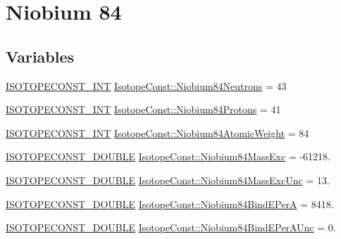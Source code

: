 \hypertarget{group___isotope_const-_niobium-_nb84}{}\section{Niobium 84}
\label{group___isotope_const-_niobium-_nb84}
\subsection*{Variables}
\begin{DoxyCompactItemize}
\item 
\mbox{\hyperlink{group___isotope_const-_macros_ga5f18360b3e99483a35c32d789e62621c}{I\+S\+O\+T\+O\+P\+E\+C\+O\+N\+S\+T\+\_\+\+I\+NT}} \mbox{\hyperlink{group___isotope_const-_niobium-_nb84_ga41d7ceaadec465ee9bd137307ea0e9d6}{Isotope\+Const\+::\+Niobium84\+Neutrons}} = 43
\item 
\mbox{\hyperlink{group___isotope_const-_macros_ga5f18360b3e99483a35c32d789e62621c}{I\+S\+O\+T\+O\+P\+E\+C\+O\+N\+S\+T\+\_\+\+I\+NT}} \mbox{\hyperlink{group___isotope_const-_niobium-_nb84_gaabbbb0f52addc00adb6d8c08ef7ca313}{Isotope\+Const\+::\+Niobium84\+Protons}} = 41
\item 
\mbox{\hyperlink{group___isotope_const-_macros_ga5f18360b3e99483a35c32d789e62621c}{I\+S\+O\+T\+O\+P\+E\+C\+O\+N\+S\+T\+\_\+\+I\+NT}} \mbox{\hyperlink{group___isotope_const-_niobium-_nb84_ga0bd887dd6a22a00e4fe5a78c0fd18c45}{Isotope\+Const\+::\+Niobium84\+Atomic\+Weight}} = 84
\item 
\mbox{\hyperlink{group___isotope_const-_macros_ga8f45a7272ce02c0b4c65c44636ed719a}{I\+S\+O\+T\+O\+P\+E\+C\+O\+N\+S\+T\+\_\+\+D\+O\+U\+B\+LE}} \mbox{\hyperlink{group___isotope_const-_niobium-_nb84_gab78a89df70b8cf8b7d3cb0ffb72dd246}{Isotope\+Const\+::\+Niobium84\+Mass\+Exc}} = -\/61218.
\item 
\mbox{\hyperlink{group___isotope_const-_macros_ga8f45a7272ce02c0b4c65c44636ed719a}{I\+S\+O\+T\+O\+P\+E\+C\+O\+N\+S\+T\+\_\+\+D\+O\+U\+B\+LE}} \mbox{\hyperlink{group___isotope_const-_niobium-_nb84_ga7fce6065a1eb9284cc8942deafefe46d}{Isotope\+Const\+::\+Niobium84\+Mass\+Exc\+Unc}} = 13.
\item 
\mbox{\hyperlink{group___isotope_const-_macros_ga8f45a7272ce02c0b4c65c44636ed719a}{I\+S\+O\+T\+O\+P\+E\+C\+O\+N\+S\+T\+\_\+\+D\+O\+U\+B\+LE}} \mbox{\hyperlink{group___isotope_const-_niobium-_nb84_ga9744388dfa7c7a28ea419c57c492131f}{Isotope\+Const\+::\+Niobium84\+Bind\+E\+PerA}} = 8418.
\item 
\mbox{\hyperlink{group___isotope_const-_macros_ga8f45a7272ce02c0b4c65c44636ed719a}{I\+S\+O\+T\+O\+P\+E\+C\+O\+N\+S\+T\+\_\+\+D\+O\+U\+B\+LE}} \mbox{\hyperlink{group___isotope_const-_niobium-_nb84_gaf331bd5dfa0c29ea83c8c2458b2dd9ed}{Isotope\+Const\+::\+Niobium84\+Bind\+E\+Per\+A\+Unc}} = 0.

\end{DoxyCompactItemize}
